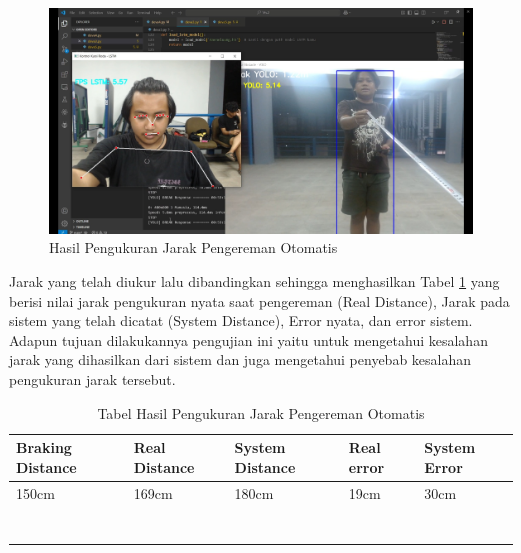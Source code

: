 \begin{figure} [H] 
  \centering
  \includegraphics[scale=0.3]{gambar/pengujianjarakdeva.jpg}
  \caption{Hasil Pengukuran Jarak Pengereman Otomatis}
  \label{fig:FotoPengambilanakurasi}
\end{figure}

Jarak yang telah diukur lalu dibandingkan sehingga menghasilkan Tabel \ref{tb:akurasijarak} yang berisi nilai jarak pengukuran nyata saat pengereman (Real Distance), Jarak pada sistem yang telah dicatat (System Distance), Error nyata, dan error sistem. Adapun tujuan dilakukannya pengujian ini yaitu untuk mengetahui kesalahan jarak yang dihasilkan dari sistem dan juga mengetahui penyebab kesalahan pengukuran jarak tersebut.

  \begin{table}[H]
    \centering
    \caption{Tabel Hasil Pengukuran Jarak Pengereman Otomatis}
    \label{tb:akurasijarak}
    \begin{tabular}{|l|l|l|l|l|}
    \hline
    Braking Distance & Real Distance & System Distance & Real error & System Error \\ \hline
    150cm             & 169cm         & 180cm           & 19cm       & 30cm         \\ \hline
                      &               &                 &            &              \\ \hline
                      &               &                 &            &              \\ \hline
                      &               &                 &            &              \\ \hline
                      &               &                 &            &              \\ \hline
                      &               &                 &            &              \\ \hline
                      &               &                 &            &              \\ \hline
                      &               &                 &            &              \\ \hline
    \end{tabular}
    \end{table}

